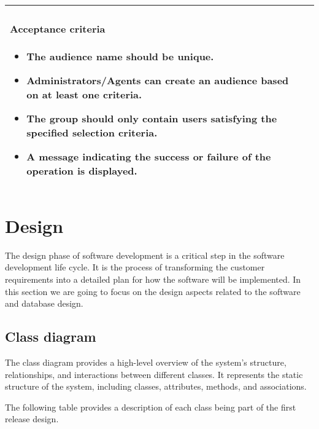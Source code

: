 \begin{longtable}{ | m{} | m{} | }
    \paragraph*{Acceptance criteria} \mbox{} \newline
    \begin{itemize}
        \item The audience name should be unique.
        \item Administrators/Agents can create an audience based on at least one criteria.
        \item The group should only contain users satisfying the specified selection criteria.
        \item A message indicating the success or failure of the operation is displayed.
    \end{itemize}                                                                                                                                                                                 \\
    \hline
\end{longtable}

\section{Design}
The design phase of software development is a critical step in the software development life cycle.
It is the process of transforming the customer requirements into a detailed plan for how the software
will be implemented. In this section we are going to focus on the design aspects related to the software
and database design.

\subsection{Class diagram}
The class diagram provides a high-level overview of the system's structure, relationships,
and interactions between different classes. It represents the static structure of the system,
including classes, attributes, methods, and associations.

\noindent The following table provides a description of each class being part of the first release design.


